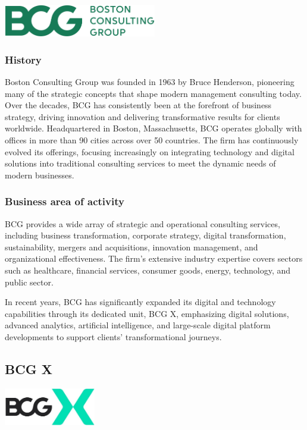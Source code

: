 \vspace{0.2cm}
\begin{center}
    \centering
    \includegraphics[width=0.5\textwidth]{Images/Boston-Consulting-Group-Logo.jpg}
     \cite{bcg_logo}
    \label{fig:bcg_logo}
\end{center}

\subsubsection{History}
Boston Consulting Group was founded in 1963 by Bruce Henderson, pioneering many of the strategic concepts that shape modern management consulting today. Over the decades, BCG has consistently been at the forefront of business strategy, driving innovation and delivering transformative results for clients worldwide. Headquartered in Boston, Massachusetts, BCG operates globally with offices in more than 90 cities across over 50 countries. The firm has continuously evolved its offerings, focusing increasingly on integrating technology and digital solutions into traditional consulting services to meet the dynamic needs of modern businesses.

\subsubsection{Business area of activity}
BCG provides a wide array of strategic and operational consulting services, including business transformation, corporate strategy, digital transformation, sustainability, mergers and acquisitions, innovation management, and organizational effectiveness. The firm's extensive industry expertise covers sectors such as healthcare, financial services, consumer goods, energy, technology, and public sector.\mynewline

In recent years, BCG has significantly expanded its digital and technology capabilities through its dedicated unit, BCG X, emphasizing digital solutions, advanced analytics, artificial intelligence, and large-scale digital platform developments to support clients' transformational journeys.

\subsection{BCG X}
\begin{center}
    \centering
    \includegraphics[width=0.3\textwidth]{Images/BCG_X.jpg}
     \cite{bcg_x_logo}
    \label{fig:bcg_x_logo}
\end{center}

